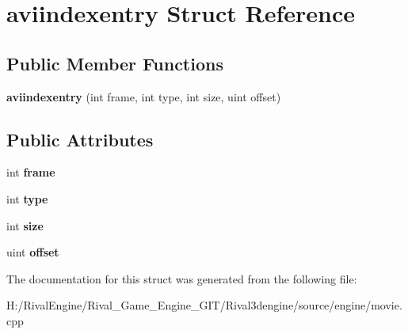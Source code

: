\hypertarget{structaviindexentry}{}\section{aviindexentry Struct Reference}
\label{structaviindexentry}
\subsection*{Public Member Functions}
\begin{DoxyCompactItemize}
\item 
\mbox{\label{structaviindexentry_a84c313766c04a8069163b2087110599f}} 
{\bfseries aviindexentry} (int frame, int type, int size, uint offset)
\end{DoxyCompactItemize}
\subsection*{Public Attributes}
\begin{DoxyCompactItemize}
\item 
\mbox{\label{structaviindexentry_a52f089f34b1a7d8fe2058b13e6a0aef0}} 
int {\bfseries frame}
\item 
\mbox{\label{structaviindexentry_a04ebe1cdc03dbac2110eb7f100e37759}} 
int {\bfseries type}
\item 
\mbox{\label{structaviindexentry_a9819fba09fb29a4248f65f5a6ad830a9}} 
int {\bfseries size}
\item 
\mbox{\label{structaviindexentry_a764ba98751adf708fc20a78877da9974}} 
uint {\bfseries offset}
\end{DoxyCompactItemize}


The documentation for this struct was generated from the following file\+:\begin{DoxyCompactItemize}
\item 
H\+:/\+Rival\+Engine/\+Rival\+\_\+\+Game\+\_\+\+Engine\+\_\+\+G\+I\+T/\+Rival3dengine/source/engine/movie.\+cpp\end{DoxyCompactItemize}
